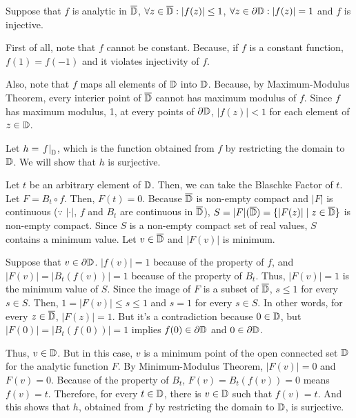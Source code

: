 \noindent
Suppose that \(f\) is analytic in \(\overline{\mathbb{D}}\), \(\forall z \in \overline{\mathbb{D}}: |f(z)| \le 1\), \(\forall z \in \partial\mathbb{D}: |f(z)| = 1\) and \(f\) is injective.
\newline

First of all, note that \(f\) cannot be constant.
Because, if \(f\) is a constant function, \(f(1) = f(-1)\) and it violates injectivity of \(f\).
\newline

Also, note that \(f\) maps all elements of \(\mathbb{D}\) into \(\mathbb{D}\).
Because, by Maximum-Modulus Theorem, every interier point of \(\overline{\mathbb{D}}\)
cannot has maximum modulus of \(f\).
Since \(f\) has maximum modulus, 1, at every points of \(\partial\mathbb{D}\),
\(|f(z)| < 1\) for each element of \(z \in \mathbb{D}\).
\newline

Let \(h = \left. f \right|_{\mathbb{D}}\), which is the function obtained from \(f\) by restricting the domain to \(\mathbb{D}\).
We will show that \(h\) is surjective.

Let \(t\) be an arbitrary element of \(\mathbb{D}\).
Then, we can take the Blaschke Factor of \(t\).
Let \(F = B_t \circ f\).
Then, \(F(t) = 0\).
Because \(\overline{\mathbb{D}}\) is non-empty compact
and \(|F|\) is continuous (\(\because\) \(|\cdot|\), \(f\) and \(B_t\) are continuous in \(\overline{\mathbb{D}}\)),
\(S = |F|(\overline{\mathbb{D}}) = \{|F(z)| \mid z \in \overline{\mathbb{D}}\}\) is non-empty compact.
Since \(S\) is a non-empty compact set of real values,
\(S\) contains a minimum value.
Let \(v \in \overline{\mathbb{D}}\) and \(|F(v)|\) is minimum.

Suppose that \(v \in \partial\mathbb{D}\).
\(|f(v)| = 1\) because of the property of \(f\),
and \(|F(v)| = |B_t(f(v))| = 1\) because of the property of \(B_t\).
Thus, \(|F(v)| = 1\) is the minimum value of \(S\).
Since the image of \(F\) is a subset of \(\overline{\mathbb{D}}\),
\(s \le 1\) for every \(s \in S\).
Then, \(1 = |F(v)| \le s \le 1\) and \(s = 1\) for every \(s \in S\).
In other words, for every \(z \in \overline{\mathbb{D}}\), \(|F(z)| = 1\).
But it's a contradiction
because \(0 \in \mathbb{D}\),
but \(|F(0)| = |B_t(f(0))| = 1\) implies \(f(0) \in \partial\mathbb{D}\) and \(0 \in \partial\mathbb{D}\).

Thus, \(v \in \mathbb{D}\).
But in this case, \(v\) is a minimum point of the open connected set \(\mathbb{D}\)
for the analytic function \(F\).
By Minimum-Modulus Theorem, \(|F(v)| = 0\) and \(F(v) = 0\).
Because of the property of \(B_t\), \(F(v) = B_t(f(v)) = 0\) means \(f(v) = t\).
Therefore, for every \(t \in \mathbb{D}\), there is \(v \in \mathbb{D}\) such that \(f(v) = t\).
And this shows that \(h\), obtained from \(f\) by restricting the domain to \(\mathbb{D}\), is surjective.
\newline

